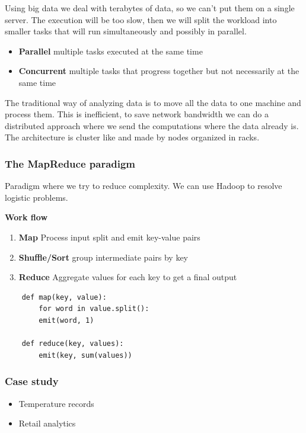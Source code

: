 Using big data we deal with terabytes of data, so we can't put them on a single server. The execution will be too slow, then we will split the workload into smaller tasks that will run simultaneously and possibly in parallel. 

\begin{itemize}
    \item \textbf{Parallel} \ra multiple tasks executed at the same time
    \item \textbf{Concurrent} \ra multiple tasks that progress together but not necessarily at the same time
\end{itemize}

The traditional way of analyzing data is to move all the data to one machine and process them. This is inefficient, to save network bandwidth we can do a distributed approach where we send the computations where the data already is. The architecture is cluster like and made by nodes organized in racks. 

\subsubsection{The MapReduce paradigm}

Paradigm where we try to reduce complexity. We can use Hadoop to resolve logistic problems. 

\textbf{Work flow} 

\begin{enumerate}
    \item \textbf{Map} \ra Process input split and emit key-value pairs
    \item \textbf{Shuffle/Sort} \ra group intermediate pairs by key
    \item \textbf{Reduce } \ra Aggregate values for each key to get a final output
\end{enumerate}

\begin{verbatim}
    def map(key, value):
        for word in value.split():
        emit(word, 1)

    def reduce(key, values):
        emit(key, sum(values))
\end{verbatim}

\subsubsection{Case study}

\begin{itemize}
    \item Temperature records
    \item Retail analytics
\end{itemize}

